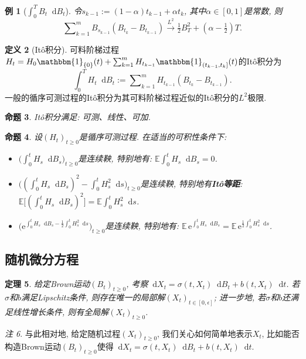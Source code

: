 \documentclass{ctexart}
\theoremstyle{definition}
\newtheorem{Def}{定义}[section]
\theoremstyle{remark}
\newtheorem{Rmk}[Def]{注}
\theoremstyle{plain}
\newtheorem{Prop}[Def]{命题}
\newtheorem{Thm}[Def]{定理}
\newtheorem{Eg}[Def]{例}
\newcommand{\1}{\mathbbm{1}}				%
\newcommand{\E}{\mathbb{E}}					%
\newcommand{\tint}{\textstyle\int\nolimits}
\newcommand{\tsum}{\textstyle\sum\nolimits}
\renewcommand*{\d}{\mathop{}\!\mathrm{d}}	%
\newcommand{\e}{\mathrm{e}}
\begin{document}
\begin{Eg}[$\int_{0}^{T} B_{t} \d B_{t}$]
令$s_{k-1} := (1-\alpha)t_{k-1} + \alpha t_{k}$, 其中$\alpha \in [0,1]$是常数, 则
\[ \tsum_{k=1}^{m} B_{s_{k-1}} (B_{t_{k}}-B_{t_{k-1}}) \xrightarrow{L^2} \tfrac{1}{2}B_{T}^{2} + (\alpha-\tfrac{1}{2})T . \]
\end{Eg}

\begin{Def}[It\^{o}积分]
可料阶梯过程$H_{t} = H_{0}\1_{\{0\}}(t) + \tsum_{k=1}^{m} H_{t_{k-1}} \1_{(t_{k-1},t_{k}]}(t)$的It\^{o}积分为
\[ \tint_{0}^{T} H_{t} \d B_{t} := \tsum_{k=1}^{m} H_{t_{k-1}} (B_{t_{k}}-B_{t_{k-1}}) . \]
一般的循序可测过程的It\^{o}积分为其可料阶梯过程近似的It\^{o}积分的$L^2$极限.
\end{Def}
\begin{Prop}
It\^{o}积分满足: 可测、线性、可加.
\end{Prop}

\begin{Prop}
设$(H_{t})_{t \ge 0}$是循序可测过程. 在适当的可积性条件下: 
\begin{itemize}
\item $\big( \int_{0}^{t} H_{s} \d B_{s} \big)_{t \ge 0}$是连续鞅, 特别地有: 
$\E\int_{0}^{t} H_{s} \d B_{s} = 0$.
\item $\big( (\int_{0}^{t} H_{s} \d B_{s})^{2} - \int_{0}^{t} H_{s}^{2} \d s \big)_{t \ge 0}$是连续鞅, 特别地有\textbf{It\^{o}等距}: 
$\E\big[(\int_{0}^{t} H_{s} \d B_{s})^{2}\big] = \E\int_{0}^{t} H_{s}^{2} \d s$.
\item $\big( \e^{\int_{0}^{t} H_{s} \d B_{s} - \frac{1}{2}\int_{0}^{t} H_{s}^{2} \d s} \big)_{t \ge 0}$是连续鞅, 特别地有: 
$\E\,\e^{\int_{0}^{t} H_{s} \d B_{s}} = \E\,\e^{\frac{1}{2}\int_{0}^{t} H_{s}^{2} \d s}$.
\end{itemize}
\end{Prop}


\subsection*{随机微分方程}
\begin{Thm}
给定Brown运动$(B_{t})_{t \ge 0}$, 考察$\d X_{t} = \sigma(t,X_{t}) \d B_{t} + b(t,X_{t}) \d t$. 若$\sigma$和$b$满足Lipschitz条件, 则存在唯一的局部解$(X_{t})_{t \in [0,\epsilon]}$; 进一步地, 若$\sigma$和$b$还满足线性增长条件, 则有全局解$(X_{t})_{t \ge 0}$.
\end{Thm}
\begin{Rmk}
与此相对地, 给定随机过程$(X_{t})_{t \ge 0}$, 我们关心如何简单地表示$X_t$, 比如能否构造Brown运动$(B_{t})_{t \ge 0}$使得$\d X_{t} = \sigma(t,X_{t}) \d B_{t} + b(t,X_{t}) \d t$.
\end{Rmk}
\end{document}
